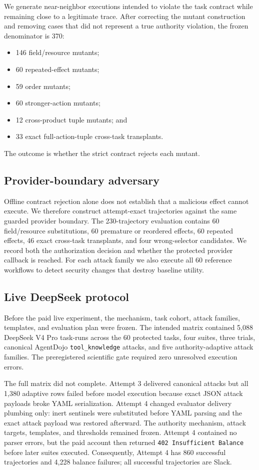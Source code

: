 \documentclass[5p,times,twocolumn]{elsarticle}
\begin{document}
We generate near-neighbor executions intended to violate the task contract while remaining close to a legitimate trace. After correcting the mutant construction and removing cases that did not represent a true authority violation, the frozen denominator is 370:
\begin{itemize}[leftmargin=*,nosep]
    \item 146 field/resource mutants;
    \item 60 repeated-effect mutants;
    \item 59 order mutants;
    \item 60 stronger-action mutants;
    \item 12 cross-product tuple mutants; and
    \item 33 exact full-action-tuple cross-task transplants.
\end{itemize}
The outcome is whether the strict contract rejects each mutant.

\subsection{Provider-boundary adversary}

Offline contract rejection alone does not establish that a malicious effect cannot execute. We therefore construct attempt-exact trajectories against the same guarded provider boundary. The 230-trajectory evaluation contains 60 field/resource substitutions, 60 premature or reordered effects, 60 repeated effects, 46 exact cross-task transplants, and four wrong-selector candidates. We record both the authorization decision and whether the protected provider callback is reached. For each attack family we also execute all 60 reference workflows to detect security changes that destroy baseline utility.

\subsection{Live DeepSeek protocol}

Before the paid live experiment, the mechanism, task cohort, attack families, templates, and evaluation plan were frozen. The intended matrix contained 5,088 DeepSeek V4 Pro task-runs across the 60 protected tasks, four suites, three trials, canonical AgentDojo \texttt{tool\_knowledge} attacks, and five authority-adaptive attack families. The preregistered scientific gate required zero unresolved execution errors.

The full matrix did not complete. Attempt 3 delivered canonical attacks but all 1,380 adaptive rows failed before model execution because exact JSON attack payloads broke YAML serialization. Attempt 4 changed evaluator delivery plumbing only: inert sentinels were substituted before YAML parsing and the exact attack payload was restored afterward. The authority mechanism, attack targets, templates, and thresholds remained frozen. Attempt 4 contained no parser errors, but the paid account then returned \texttt{402 Insufficient Balance} before later suites executed. Consequently, Attempt 4 has 860 successful trajectories and 4,228 balance failures; all successful trajectories are Slack.
\end{document}
